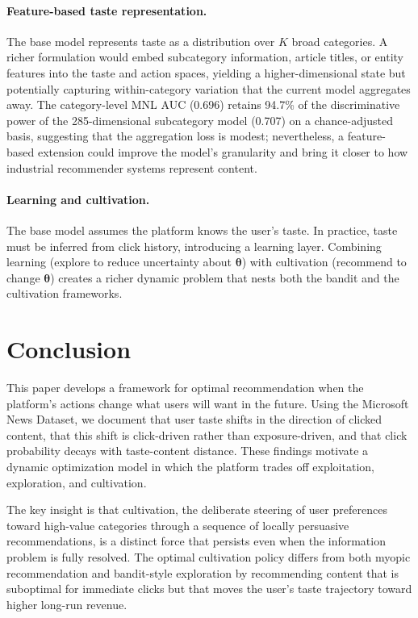 \documentclass[11pt]{article}
\begin{document}
\paragraph{Feature-based taste representation.} The base model represents taste as a distribution over $K$ broad categories. A richer formulation would embed subcategory information, article titles, or entity features into the taste and action spaces, yielding a higher-dimensional state but potentially capturing within-category variation that the current model aggregates away. The category-level MNL AUC (0.696) retains 94.7\% of the discriminative power of the 285-dimensional subcategory model (0.707) on a chance-adjusted basis, suggesting that the aggregation loss is modest; nevertheless, a feature-based extension could improve the model's granularity and bring it closer to how industrial recommender systems represent content.

\paragraph{Learning and cultivation.} The base model assumes the platform knows the user's taste. In practice, taste must be inferred from click history, introducing a learning layer. Combining learning (explore to reduce uncertainty about $\boldsymbol{\theta}$) with cultivation (recommend to change $\boldsymbol{\theta}$) creates a richer dynamic problem that nests both the bandit and the cultivation frameworks.

\section{Conclusion}
\label{sec:conclusion}

This paper develops a framework for optimal recommendation when the platform's actions change what users will want in the future. Using the Microsoft News Dataset, we document that user taste shifts in the direction of clicked content, that this shift is click-driven rather than exposure-driven, and that click probability decays with taste-content distance. These findings motivate a dynamic optimization model in which the platform trades off exploitation, exploration, and cultivation.

The key insight is that cultivation, the deliberate steering of user preferences toward high-value categories through a sequence of locally persuasive recommendations, is a distinct force that persists even when the information problem is fully resolved. The optimal cultivation policy differs from both myopic recommendation and bandit-style exploration by recommending content that is suboptimal for immediate clicks but that moves the user's taste trajectory toward higher long-run revenue.
\end{document}
